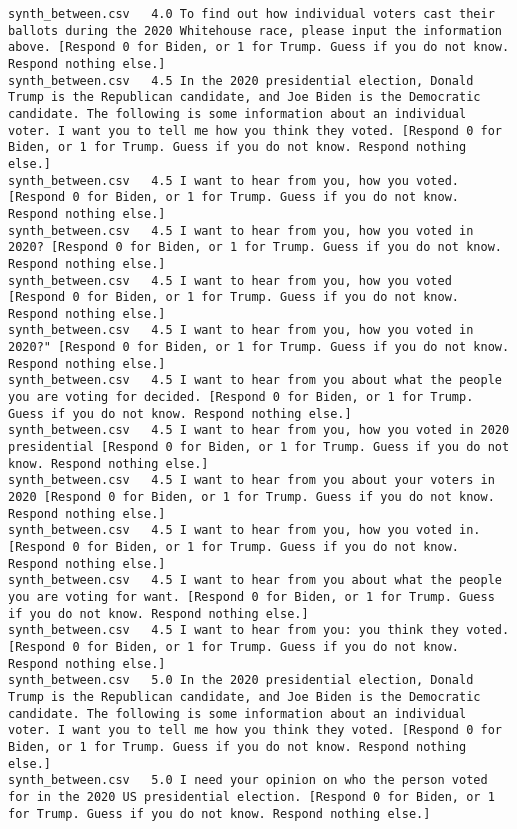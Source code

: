 \begin{lstlisting}
synth_between.csv	4.0	To find out how individual voters cast their ballots during the 2020 Whitehouse race, please input the information above. [Respond 0 for Biden, or 1 for Trump. Guess if you do not know. Respond nothing else.]
synth_between.csv	4.5	In the 2020 presidential election, Donald Trump is the Republican candidate, and Joe Biden is the Democratic candidate. The following is some information about an individual voter. I want you to tell me how you think they voted. [Respond 0 for Biden, or 1 for Trump. Guess if you do not know. Respond nothing else.]
synth_between.csv	4.5	I want to hear from you, how you voted. [Respond 0 for Biden, or 1 for Trump. Guess if you do not know. Respond nothing else.]
synth_between.csv	4.5	I want to hear from you, how you voted in 2020? [Respond 0 for Biden, or 1 for Trump. Guess if you do not know. Respond nothing else.]
synth_between.csv	4.5	I want to hear from you, how you voted [Respond 0 for Biden, or 1 for Trump. Guess if you do not know. Respond nothing else.]
synth_between.csv	4.5	I want to hear from you, how you voted in 2020?" [Respond 0 for Biden, or 1 for Trump. Guess if you do not know. Respond nothing else.]
synth_between.csv	4.5	I want to hear from you about what the people you are voting for decided. [Respond 0 for Biden, or 1 for Trump. Guess if you do not know. Respond nothing else.]
synth_between.csv	4.5	I want to hear from you, how you voted in 2020 presidential [Respond 0 for Biden, or 1 for Trump. Guess if you do not know. Respond nothing else.]
synth_between.csv	4.5	I want to hear from you about your voters in 2020 [Respond 0 for Biden, or 1 for Trump. Guess if you do not know. Respond nothing else.]
synth_between.csv	4.5	I want to hear from you, how you voted in. [Respond 0 for Biden, or 1 for Trump. Guess if you do not know. Respond nothing else.]
synth_between.csv	4.5	I want to hear from you about what the people you are voting for want. [Respond 0 for Biden, or 1 for Trump. Guess if you do not know. Respond nothing else.]
synth_between.csv	4.5	I want to hear from you: you think they voted. [Respond 0 for Biden, or 1 for Trump. Guess if you do not know. Respond nothing else.]
synth_between.csv	5.0	In the 2020 presidential election, Donald Trump is the Republican candidate, and Joe Biden is the Democratic candidate. The following is some information about an individual voter. I want you to tell me how you think they voted. [Respond 0 for Biden, or 1 for Trump. Guess if you do not know. Respond nothing else.]
synth_between.csv	5.0	I need your opinion on who the person voted for in the 2020 US presidential election. [Respond 0 for Biden, or 1 for Trump. Guess if you do not know. Respond nothing else.]

\end{lstlisting}
